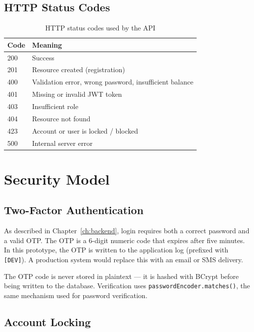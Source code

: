 \documentclass[12pt,a4paper]{report}
\begin{document}
\section{HTTP Status Codes}

\begin{table}[H]
  \centering
  \caption{HTTP status codes used by the API}
  \begin{tabular}{ll}
    \toprule
    \textbf{Code} & \textbf{Meaning} \\
    \midrule
    200 & Success \\
    201 & Resource created (registration) \\
    400 & Validation error, wrong password, insufficient balance \\
    401 & Missing or invalid JWT token \\
    403 & Insufficient role \\
    404 & Resource not found \\
    423 & Account or user is locked / blocked \\
    500 & Internal server error \\
    \bottomrule
  \end{tabular}
\end{table}

\chapter{Security Model}
\label{ch:security}

\section{Two-Factor Authentication}

As described in Chapter~\ref{ch:backend}, login requires both a correct password
and a valid OTP. The OTP is a 6-digit numeric code that expires after five minutes.
In this prototype, the OTP is written to the application log (prefixed with
\texttt{[DEV]}). A production system would replace this with an email or SMS delivery.

The OTP code is never stored in plaintext — it is hashed with BCrypt before being
written to the database. Verification uses \texttt{passwordEncoder.matches()},
the same mechanism used for password verification.

\section{Account Locking}
\end{document}
